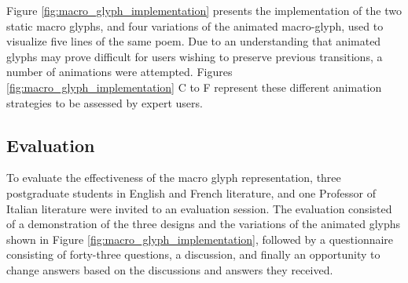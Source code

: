 Figure \ref{fig:macro_glyph_implementation} presents the implementation of the two static macro glyphs, and four variations of the animated macro-glyph, used to visualize five lines of the same poem. 
Due to an understanding that animated glyphs may prove difficult for users wishing to preserve previous transitions, a number of animations were attempted.
Figures \ref{fig:macro_glyph_implementation} C to F represent these different animation strategies to be assessed by expert users.

\subsection{Evaluation}

To evaluate the effectiveness of the macro glyph representation, three postgraduate students in English and French literature, and one Professor of Italian literature were invited to an evaluation session. 
The evaluation consisted of a demonstration of the three designs and the variations of the animated glyphs shown in Figure \ref{fig:macro_glyph_implementation}, followed by a questionnaire consisting of forty-three questions, a discussion, and finally an opportunity to change answers based on the discussions and answers they received.

